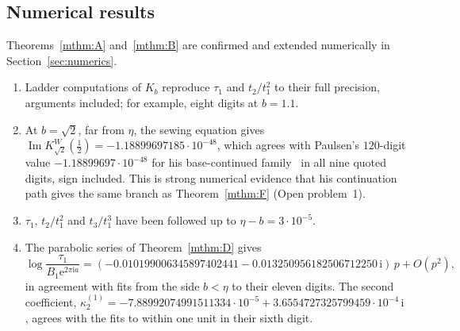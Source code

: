 \documentclass[11pt]{amsart}
\theoremstyle{definition}
\newcommand{\Kk}{K}
\newcommand{\eee}{\mathrm{e}}
\newcommand{\ii}{\mathrm{i}}
\begin{document}
\subsection*{Numerical results}
Theorems~\ref{mthm:A} and~\ref{mthm:B} are confirmed and extended numerically
in Section~\ref{sec:numerics}.
\begin{enumerate}
\item Ladder computations of $\Kk_b$ reproduce $\tau_1$ and $t_2/t_1^2$ to their
  full precision, arguments included; for example, eight digits at $b=1.1$.
\item At $b=\sqrt2$, far from $\eta$, the sewing equation gives
  $\operatorname{Im}\Kk^W_{\sqrt2}(\tfrac12)=-1.18899697185\cdot10^{-48}$, which agrees with
  Paulsen's $120$-digit value $-1.18899697\cdot10^{-48}$ for his base-continued
  family~\cite[\S6]{Paulsen2019} in all nine quoted digits, sign included.  This is
  strong numerical evidence that his continuation path gives the same branch
  as Theorem~\ref{mthm:F} (Open problem~1).
\item $\tau_1$, $t_2/t_1^2$ and $t_3/t_1^3$ have been followed up to
  $\eta-b=3\cdot10^{-5}$.
\item The parabolic series of Theorem~\ref{mthm:D} gives
  \[
   \log\frac{\tau_1}{B_1\eee^{2\pi\ii a}}=(-0.010199006345897402441-0.013250956182506712250\,\ii)\,p+O(p^{2}),
  \]
  in agreement with fits from the side $b<\eta$ to their eleven digits.  The
  second coefficient,
  $\kappa^{(1)}_2=-7.88992074991511334\cdot10^{-5}+3.6554727325799459\cdot10^{-4}\,\ii$,
  agrees with the fits to within one unit in their sixth digit.
\end{enumerate}
\end{document}
